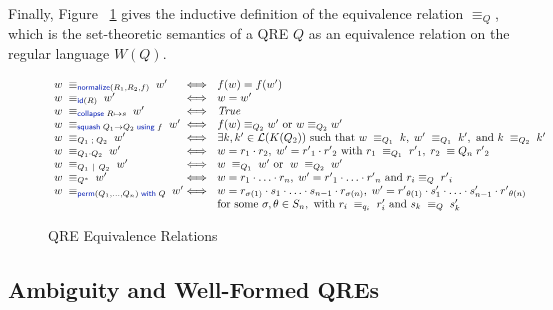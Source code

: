 \documentclass[acmsmall,screen]{acmart}
\newcommand{\kw}[1]{\textcolor{dkblue}{\ensuremath{\mathsf{#1}}}}
\newcommand{\collapse}[2]{\ensuremath{\kw{collapse} \; #1 \mapsto #2}}
\newcommand{\squash}[3]{\ensuremath{\kw{squash} \; #1 \rightarrow #2\; \kw{using} \; #3}}
\newcommand{\perm}[2]{\ensuremath{\kw{perm}(#1)\; \kw{with}\; #2}}
\newcommand{\normalize}[3]{\ensuremath{\kw{normalize}(#1, #2, #3)}}
\newcommand{\eqrel}[1]{\ensuremath{\equiv_{#1}}}
\newcommand{\sep}{\ensuremath{\ | \ }}
\newcommand{\id}{\ensuremath{\kw{id}}}
\begin{document}
Finally, Figure ~\ref{fig:relations} gives the inductive definition of the
equivalence relation $\eqrel{Q}$, which is the set-theoretic semantics
of a QRE $Q$ as an equivalence relation on the regular language $W(Q)$.

\begin{figure}[t]
\centering
\[
\begin{array}{l@{}l@{\ \ }l}
w \; \equiv_{\normalize{R_1}{R_2}{f}} \; w' &\iff&
f(w)=f(w') \\
w \; \equiv_{\id(R)} \; w' &\iff& w = w' \\
w \; \equiv_{\collapse{R}{s}} \; w' &\iff& \mathit{True} \\ %
w \; \equiv_{\squash{Q_1}{Q_2}{f}} \; w' &\iff& f(w) \equiv_{Q_2} w'
\text{ or } w \equiv_{Q_2} w' \\
w \; \equiv_{Q_1 \; ; \; Q_2} \; w' &\iff& \exists k, k' \in
\mathcal{L}(K(Q_2)) \text{ such that } w \; \equiv_{Q_1} \; k, \; w' \;
\equiv_{Q_1} \; k', \text{ and } k \; \equiv_{Q_2} \; k'\\
w \; \equiv_{Q_1 \cdot Q_2} \; w'  &\iff& w = r_1
\cdot r_2, \; w' = {r'}_1 \cdot {r'}_2 \text{ with } r_1 \; \equiv_{Q_1}
\; {r'}_1, \; r_2 \; \equiv{Q_n} \; {r'}_2\\
w \; \equiv_{Q_1 \sep Q_2} \; w' &\iff& w \; \equiv_{Q_1} \; w'
\text{ or } \; w \; \equiv_{Q_2} \; w'\\
w \; \equiv_{Q^*} \; w' &\iff& w = r_1 \cdot \ldots \cdot r_n, \; w'
= {r'}_1 \cdot \ldots \cdot {r'}_n \text{ and } r_i \equiv_{Q} \; {r'}_i
\\
w \; \equiv_{\perm{Q_1, \ldots, Q_n}{Q}} \; w' &\iff& w = r_{\sigma(1)}
\cdot s_1 \cdot \ldots \cdot s_{n-1} \cdot r_{\sigma(n)}, \;
w' = {r'}_{\theta(1)} \cdot s'_1 \cdot \ldots \cdot s'_{n-1}
\cdot {r'}_{\theta(n)} \\
& & \text{for some } \sigma, \theta \in S_n, \text{ with } r_i \;
\equiv_{q_i} \; r'_i \text{ and } s_k \; \equiv_{Q} \; s'_{k}
\end{array}
\]
\caption{QRE Equivalence Relations}
\label{fig:relations}
\end{figure}
\subsection{Ambiguity and Well-Formed QREs}
\label{subsec:well-formed-qres}
\end{document}
